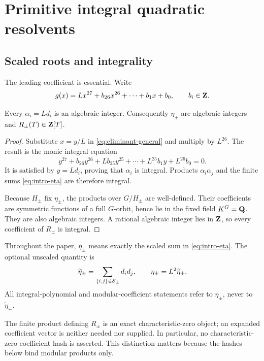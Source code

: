 \section{Primitive integral quadratic resolvents}
\label{sec:primitive}

\subsection{Scaled roots and integrality}

The leading coefficient is essential.  Write
\begin{equation}
 g(x)=Lx^{27}+b_{26}x^{26}+\cdots+b_1x+b_0,
 \qquad b_i\in\mathbf{Z}.
 \label{eq:eliminant-general}
\end{equation}

\begin{lemma}
\label{lem:integral-scaling}
Every $\alpha_i=Ld_i$ is an algebraic integer.  Consequently
$\eta_\pm$ are algebraic integers and $R_\pm(T)\in\mathbf{Z}[T]$.
\end{lemma}

\begin{proof}
Substitute $x=y/L$ in \eqref{eq:eliminant-general} and multiply by
$L^{26}$.  The result is the monic integral equation
\[
 y^{27}+b_{26}y^{26}+Lb_{25}y^{25}+\cdots
   +L^{25}b_1y+L^{26}b_0=0.
\]
It is satisfied by $y=Ld_i$, proving that $\alpha_i$ is integral.  Products
$\alpha_i\alpha_j$ and the finite sums \eqref{eq:intro-eta} are therefore
integral.

Because $H_\pm$ fix $\eta_\pm$, the products over $G/H_\pm$ are
well-defined.  Their coefficients are symmetric functions of a full
$G$-orbit, hence lie in the fixed field $K^G=\mathbf{Q}$.  They are also algebraic
integers.  A rational algebraic integer lies in $\mathbf{Z}$, so every coefficient
of $R_\pm$ is integral.
\end{proof}

\begin{convention}
\label{conv:eta-scaling}
Throughout the paper, $\eta_\pm$ means exactly the scaled sum in
\eqref{eq:intro-eta}.  The optional unscaled quantity is
\[
 \widetilde\eta_\pm
   =\sum_{\{i,j\}\in\mathcal{S}_\pm}d_id_j,
 \qquad
 \eta_\pm=L^2\widetilde\eta_\pm.
\]
All integral-polynomial and modular-coefficient statements refer to
$\eta_\pm$, never to $\widetilde\eta_\pm$.
\end{convention}

The finite product defining $R_\pm$ is an exact characteristic-zero object;
an expanded coefficient vector is neither needed nor supplied.  In
particular, no characteristic-zero coefficient hash is asserted.  This
distinction matters because the hashes below bind modular products only.


